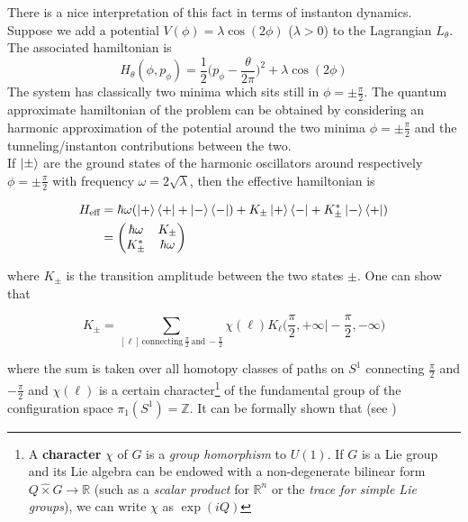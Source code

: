 \documentclass[11pt]{article}
\theoremstyle{definition}
\numberwithin{equation}{section}
\begin{document}
There is a nice interpretation of this fact in terms of instanton dynamics. Suppose we add a potential $V(\phi) = \lambda \cos(2 \phi)$ ($\lambda>0$) to the Lagrangian $L_{\theta}$. The associated hamiltonian is
\begin{equation}
    H_{\theta}(\phi, p_{\phi}) = \frac{1}{2}\bigg( p_{\phi} - \frac{\theta}{2 \pi} \bigg)^2 + \lambda \cos(2 \phi)
\end{equation}
The system has classically two minima which sits still in $\phi= \pm \frac{\pi}{2}$. The quantum approximate hamiltonian of the problem can be obtained by considering an harmonic approximation of the potential around the two minima $\phi= \pm \frac{\pi}{2}$ and the tunneling/instanton contributions between the two. \\

If $\ket{\pm}$ are the ground states of the harmonic oscillators around respectively  $\phi= \pm \frac{\pi}{2}$ with frequency $\omega = 2 \sqrt{\lambda}$, then the effective hamiltonian is


\begin{equation}
\begin{aligned}
    H_{\text{eff}} &= \hbar \omega ( \ket{+}\bra{+} +   \ket{-}\bra{-} )+ K_{\pm}  \ket{+}\bra{-} +   K_{\pm}^*\ket{-}\bra{+} )\\
    &= \begin{pmatrix}
 \hbar \omega &K_{\pm}\\
 K_{\pm}^* &\hbar \omega
    \end{pmatrix}
    \end{aligned}
\end{equation}

where $K_{\pm}$ is the transition amplitude between the two states $\pm$. One can show that

\begin{equation}
    K_{\pm} = \sum_{[\ell]\, \text{connecting} \, \frac{\pi}{2}\,\text{and}\, -\frac{\pi}{2}} \chi(\ell) K_{\ell}\bigg(\frac{\pi}{2}, + \infty \bigg| -\frac{\pi}{2}, - \infty \bigg)
\end{equation}

where the sum is taken over all homotopy classes of paths on $S^1$ connecting $\frac{\pi}{2}$ and $-\frac{ \pi}{2}$ and $\chi(\ell)$ is a certain character\footnote{
    A \textbf{character} $\chi$ of $G$ is a \textit{group homorphism} to $U(1)$. If $G$ is a Lie group and its Lie algebra can be endowed with a non-degenerate bilinear form $Q \hat \times G \to \mathbb{R}$ (such as a \textit{scalar product} for $\mathbb{R}^n$ or the \textit{trace for simple Lie groups}), we can write $\chi$ as $\exp(i Q)$

} 
of the fundamental group of the configuration space $\pi_1(S^1) = \mathbb{Z}$. It can be formally shown that (see \cite[Section 2.8]{percacci})
\end{document}

